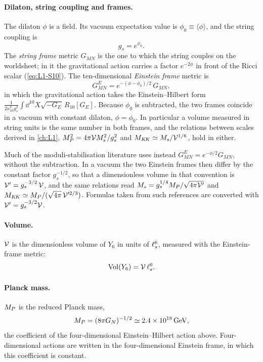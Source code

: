 \paragraph{Dilaton, string coupling and frames.} The dilaton $\phi$ is a field. Its vacuum expectation value is $\phi_0 \equiv \langle\phi\rangle$, and the string coupling is
\begin{equation*}
  g_s = e^{\phi_0} .
\end{equation*}
The \emph{string frame} metric $G_{MN}$ is the one to which the string couples on the worldsheet; in it the gravitational action carries a factor $e^{-2\phi}$ in front of the Ricci scalar (\cref{eq:L1-S10}). The ten-dimensional \emph{Einstein frame} metric is
\begin{equation*}
  G^E_{MN} = e^{-(\phi-\phi_0)/2}\,G_{MN} ,
\end{equation*}
in which the gravitational action takes the Einstein--Hilbert form $\frac{1}{2\kappa_{10}^2 g_s^2}\int\dd^{10}X\sqrt{-G_E}\,R_{10}[G_E]$. Because $\phi_0$ is subtracted, the two frames coincide in a vacuum with constant dilaton, $\phi = \phi_0$. In particular a volume measured in string units is the same number in both frames, and the relations between scales derived in \cref{ch:L1}, $M_{P}^2 = 4\pi\mathcal{V}M_{s}^2/g_s^2$ and $M_{K\!K} \simeq M_{s}/\mathcal{V}^{1/6}$, hold in either.

Much of the moduli-stabilisation literature uses instead $G^E_{MN} = e^{-\phi/2}G_{MN}$, without the subtraction. In a vacuum the two Einstein frames then differ by the constant factor $g_s^{-1/2}$, so that a dimensionless volume in that convention is $\mathcal{V}' = g_s^{-3/2}\,\mathcal{V}$, and the same relations read $M_{s} = g_s^{1/4}M_{P}/\sqrt{4\pi\mathcal{V}'}$ and $M_{K\!K}\simeq M_{P}/(\sqrt{4\pi}\,\mathcal{V}'^{2/3})$. Formulas taken from such references are converted with $\mathcal{V}' = g_s^{-3/2}\mathcal{V}$.

\paragraph{Volume.} $\mathcal{V}$ is the dimensionless volume of $Y_6$ in units of $\ell_s^6$, measured with the Einstein-frame metric:
\begin{equation*}
  \mathrm{Vol}(Y_6) = \mathcal{V}\,\ell_s^6 .
\end{equation*}

\paragraph{Planck mass.} $M_{P}$ is the reduced Planck mass,
\begin{equation*}
  M_{P} = (8\pi G_N)^{-1/2} \simeq 2.4\times10^{18}\,\mathrm{GeV} ,
\end{equation*}
the coefficient of the four-dimensional Einstein--Hilbert action above. Four-dimensional actions are written in the four-dimensional Einstein frame, in which this coefficient is constant.

